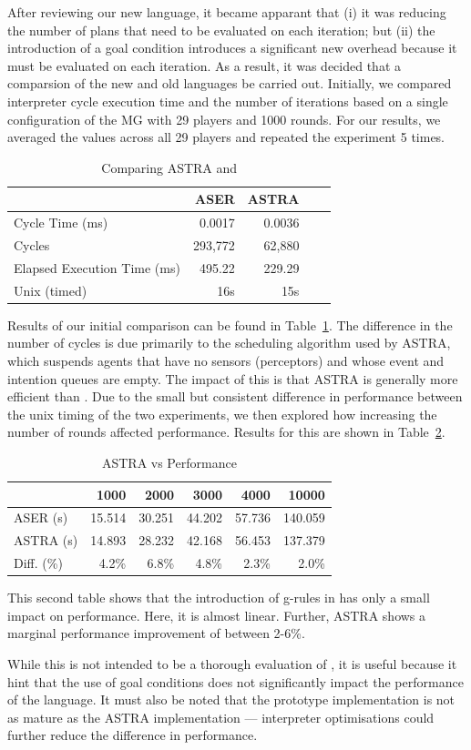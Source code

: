 After reviewing our new language, it became apparant that (i) it was reducing the number of plans 
that need to be evaluated on each iteration; but (ii) the introduction of a goal condition introduces
a significant new overhead because it must be evaluated on each iteration.
As a result, it was decided that a comparsion of the new and old languages be carried out. Initially,
we compared interpreter cycle execution time and the number of iterations based on a single 
configuration of the MG with 29 players and 1000 rounds. For our results, we averaged
the values across all 29 players and repeated the experiment 5 times.

\begin{table}[]
\centering
\caption{Comparing ASTRA and {\aser}}
\label{comparison}
\begin{tabular}{lrrrr}
                            & ASER    & ASTRA  \\ \toprule
Cycle Time (ms)             & 0.0017  & 0.0036 \\
Cycles                      & 293,772 & 62,880 \\
Elapsed Execution Time (ms) & 495.22  & 229.29 \\
Unix (timed)                & 16s     & 15s   
\end{tabular}
\end{table}

Results of our initial comparison can be found in Table~\ref{comparison}. The difference
in the number of cycles is due primarily to the scheduling algorithm used by ASTRA, which
suspends agents that have no sensors (perceptors) and whose event and intention queues are empty.
The impact of this is that ASTRA is generally more efficient than {\aser}. Due to the small but 
consistent difference in performance between the unix timing of the two experiments, we then 
explored how increasing the number of rounds affected performance. Results for this are shown 
in Table~\ref{rounds}.

\begin{table}[]
\centering
\caption{ASTRA vs {\aser} Performance}
\label{rounds}
\begin{tabular}{lrrrrr}
           & 1000   & 2000   & 3000   & 4000   & 10000   \\ \toprule
ASER (s)   & 15.514 & 30.251 & 44.202 & 57.736 & 140.059 \\
ASTRA (s)  & 14.893 & 28.232 & 42.168 & 56.453 & 137.379 \\
Diff. (\%) & 4.2\%  & 6.8\%  & 4.8\%  & 2.3\%  & 2.0\%  
\end{tabular}
\end{table}

This second table shows that the introduction of g-rules in {\aser} has only a small impact on 
performance. Here, it is almost linear. Further, ASTRA shows a marginal performance improvement of between 2-6\%.

While this is not intended to be a thorough evaluation of {\aser}, it is useful because
it hint that the use of goal conditions does not significantly impact the performance 
of the language. It must also be noted that the prototype implementation is not as mature 
as the ASTRA implementation --- interpreter optimisations could further reduce the difference 
in performance.
